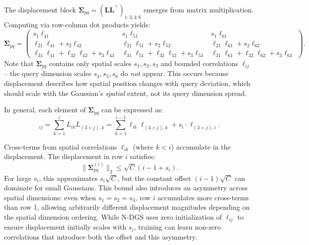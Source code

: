 \documentclass{article}
\theoremstyle{plain}
\theoremstyle{definition}
\theoremstyle{remark}
\begin{document}
The displacement block $\boldsymbol{\Sigma}_{pq} = (\mathbf{L}\mathbf{L}^\top)_{1:3,4:6}$ emerges from matrix multiplication. Computing via row-column dot products yields:
\begin{equation}
\boldsymbol{\Sigma}_{pq} = \left(\begin{array}{rrr}
                           s_1 \ell_{41} &                            s_1 \ell_{51} &                            s_1 \ell_{61} \\
     \ell_{21}\ell_{41} + s_2 \ell_{42} &      \ell_{21}\ell_{51} + s_2 \ell_{52} &      \ell_{21}\ell_{61} + s_2 \ell_{62} \\
\ell_{31}\ell_{41} + \ell_{32}\ell_{42} + s_3 \ell_{43} & \ell_{31}\ell_{51} + \ell_{32}\ell_{52} + s_3 \ell_{53} & \ell_{31}\ell_{61} + \ell_{32}\ell_{62} + s_3 \ell_{63}
\end{array}\right).
\end{equation}
Note that $\boldsymbol{\Sigma}_{pq}$ contains only spatial scales $s_1, s_2, s_3$ and bounded correlations $\ell_{ij}$ -- the query dimension scales $s_4, s_5, s_6$ do \textit{not} appear. This occurs because displacement describes how spatial position changes with query deviation, which should scale with the Gaussian's \textit{spatial} extent, not its query dimension spread.

In general, each element of $\boldsymbol{\Sigma}_{pq}$ can be expressed as:
\begin{equation}
[\boldsymbol{\Sigma}_{pq}]_{ij} = \sum_{k=1}^{i} L_{ik} L_{(3+j),k} = \sum_{k=1}^{i-1} \ell_{ik} \ell_{(3+j),k} + s_i \cdot \ell_{(3+j),i}.
\end{equation}

Cross-terms from spatial correlations $\ell_{ik}$ (where $k < i$) accumulate in the displacement. The displacement in row $i$ satisfies:
\begin{equation}
\|\boldsymbol{\Sigma}_{pq}^{(i)}\|_2 \leq \sqrt{C}(i-1 + s_i).
\end{equation}
For large $s_i$, this approximates $s_i \sqrt{C}$, but the constant offset $(i-1)\sqrt{C}$ can dominate for small Gaussians. This bound also introduces an asymmetry across spatial dimensions: even when $s_1 = s_2 = s_3$, row $i$ accumulates more cross-terms than row 1, allowing arbitrarily different displacement magnitudes depending on the spatial dimension ordering. While N-DGS uses zero initialization of $\ell_{ij}$ to ensure displacement initially scales with $s_i$, training can learn non-zero correlations that introduce both the offset and this asymmetry.
\end{document}
